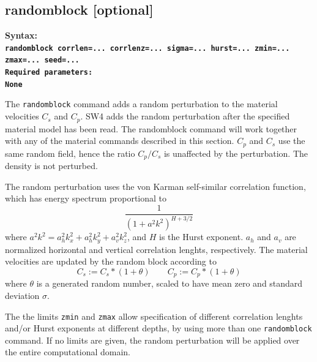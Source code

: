 \documentclass[11pt]{report}
\begin{document}

\subsection{randomblock [optional]}
\label{keyword:randomblock}
\begin{flushleft}\bf
Syntax:\\
\tt randomblock corrlen=... corrlenz=... sigma=... hurst=... zmin=... zmax=... seed=...  \\
\bf Required parameters:\\
\rm None
\end{flushleft}
The {\tt randomblock} command adds a random perturbation to the material velocities $C_s$ and $C_p$. SW4 adds the random
perturbation after the specified material model has been read. The randomblock command will work together with any of
the material commands described in this section.
$C_p$ and $C_s$ use the same random field, hence the ratio $C_p/C_s$ is
unaffected by the perturbation. The density is not perturbed. \par
The random perturbation uses the von Karman self-similar correlation function, which has energy spectrum
proportional to
$$
  \frac{1}{(1+a^2k^2)^{H+3/2}}
$$
where $a^2k^2=a_h^2k_x^2+a_h^2k_y^2+a_v^2k_z^2$, and $H$ is the Hurst exponent. $a_h$ and $a_v$ are normalized
horizontal and vertical correlation lenghts, respectively.
The material velocities are updated by the random block according to
$$
 C_s := C_s*(1+\theta)\qquad  C_p := C_p*(1+\theta)
$$
where $\theta$ is a generated random number, scaled to have mean zero and standard deviation $\sigma$. \par
The the limits {\tt zmin} and {\tt zmax} allow specification of different correlation lenghts and/or Hurst exponents
at different depths, by using more than one {\tt randomblock} command. If no limits are given, the random perturbation 
will be applied over the entire computational domain. 
\end{document}
